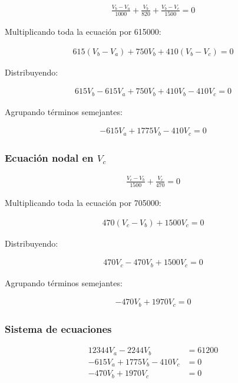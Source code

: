 \documentclass[conference]{IEEEtran}
\begin{document}
\begin{align*}
\frac{V_b-V_a}{1000}+\frac{V_b}{820}+\frac{V_b-V_c}{1500}=0
\end{align*}

Multiplicando toda la ecuación por 615000:

\begin{align*}
615(V_b-V_a)+750V_b+410(V_b-V_c)=0
\end{align*}

Distribuyendo:

\begin{align*}
615V_b-615V_a+750V_b+410V_b-410V_c=0
\end{align*}

Agrupando términos semejantes:

\begin{align*}
-615V_a+1775V_b-410V_c=0
\end{align*}

\subsubsection{Ecuación nodal en $V_c$}

\begin{align*}
\frac{V_c-V_b}{1500}+\frac{V_c}{470}=0
\end{align*}

Multiplicando toda la ecuación por 705000:

\begin{align*}
470(V_c-V_b)+1500V_c=0
\end{align*}

Distribuyendo:

\begin{align*}
470V_c-470V_b+1500V_c=0
\end{align*}

Agrupando términos semejantes:

\begin{align*}
-470V_b+1970V_c=0
\end{align*}

\subsubsection{Sistema de ecuaciones}

\begin{align*}
12344V_a-2244V_b&=61200 \\
-615V_a+1775V_b-410V_c&=0 \\
-470V_b+1970V_c&=0
\end{align*}
\end{document}
